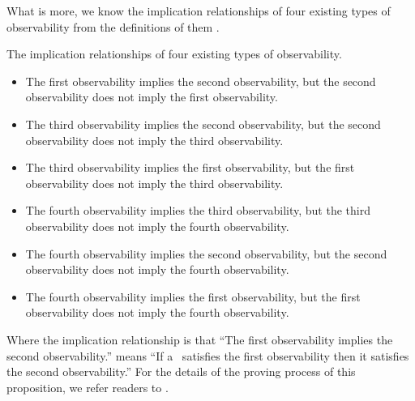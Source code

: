 What is more, we know the implication relationships of four existing types of observability from the definitions of them \cite{Zhang2016Observability}. 
\begin{proposition}
The implication relationships of four existing types of observability.
\begin{itemize}
\item The first observability implies the second observability, but the second observability does not imply the first observability.\\
\item The third observability implies the second observability, but the second observability does not imply the third observability.\\
\item The third observability implies the first observability, but the first observability does not imply the third observability.\\
\item The fourth observability implies the third observability, but the third observability does not imply the fourth observability.\\
\item The fourth observability implies the second observability, but the second observability does not imply the fourth observability.\\
\item The fourth observability implies the first observability, but the first observability does not imply the fourth observability. \\
\end{itemize} 
\end{proposition}
Where the implication relationship is that ``The first observability implies the second observability.'' means ``If a \BCN\ satisfies the first observability then it satisfies the second observability.'' For the details of the proving process of this proposition, we refer readers to \cite{Zhang2016Observability}.
 

